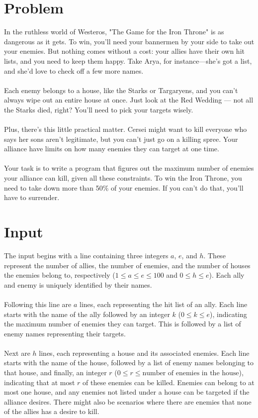 
\section{Problem}
In the ruthless world of Westeros, "The Game for the Iron Throne" is as dangerous as it gets. To win, you'll need your bannermen by your side to take out your enemies. But nothing comes without a cost: your allies have their own hit lists, and you need to keep them happy. Take Arya, for instance—she's got a list, and she'd love to check off a few more names.
\\\\
Each enemy belongs to a house, like the Starks or Targaryens, and you can't always wipe out an entire house at once. Just look at the Red Wedding — not all the Starks died, right? You’ll need to pick your targets wisely.
\\\\
Plus, there’s this little practical matter. Cersei might want to kill everyone who says her sons aren’t legitimate, but you can’t just go on a killing spree. Your alliance have limits on how many enemies they can target at one time.
\\\\
Your task is to write a program that figures out the maximum number of enemies your alliance can kill, given all these constraints. To win the Iron Throne, you need to take down more than 50\% of your enemies. If you can't do that, you'll have to surrender.

\section{Input}
The input begins with a line containing three integers \( a \), \( e \), and \( h \). These represent the number of allies, the number of enemies, and the number of houses the enemies belong to, respectively (\(1 \leq a \leq e \leq 100\) and \(0 \leq h \leq e\)). Each ally and enemy is uniquely identified by their names.
\\\\
Following this line are \( a \) lines, each representing the hit list of an ally. Each line starts with the name of the ally followed by an integer  \( k \) (\(0 \leq k \leq e\)), indicating the maximum number of enemies they can target. This is followed by a list of enemy names representing their targets. 
\\\\
Next are \( h \) lines, each representing a house and its associated enemies. Each line starts with the name of the house, followed by a list of enemy names belonging to that house, and finally, an integer \( r \) (\(0 \leq r \leq \text{number of enemies in the house}\)), indicating that at most \( r \) of these enemies can be killed. Enemies can belong to at most one house, and any enemies not listed under a house can be targeted if the alliance desires. There might also be scenarios where there are enemies that none of the allies has a desire to kill. 

